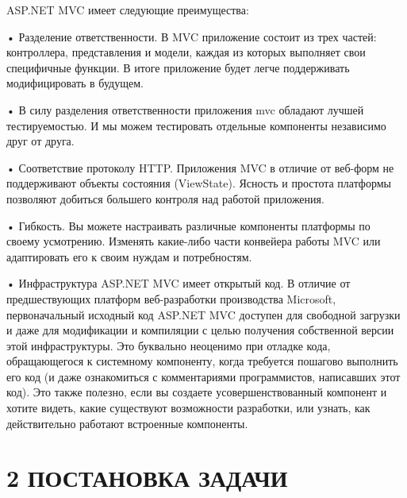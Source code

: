 \documentclass[14pt,a4paper]{extreport}
\begin{document}
	\parindent=1cm ASP.NET MVC имеет следующие преимущества:\par
	• Разделение ответственности. В MVC приложение состоит из трех частей: контроллера, представления и модели, каждая из которых выполняет свои специфичные функции. В итоге приложение будет легче поддерживать модифицировать в будущем.\par
	• В силу разделения ответственности приложения mvc обладают лучшей тестируемостью. И мы можем тестировать отдельные компоненты независимо друг от друга.\par
	• Соответствие протоколу HTTP. Приложения MVC в отличие от веб-форм не поддерживают объекты состояния (ViewState). Ясность и простота платформы позволяют добиться большего контроля над работой приложения.\par
	• Гибкость. Вы можете настраивать различные компоненты платформы по своему усмотрению. Изменять какие-либо части конвейера работы MVC или адаптировать его к своим нуждам и потребностям.\par
	• Инфраструктура ASP.NET MVC имеет открытый код. В отличие от предшествующих платформ веб-разработки производства Microsoft, первоначальный исходный код ASP.NET MVC доступен для свободной загрузки и даже для модификации и компиляции с целью получения собственной версии этой инфраструктуры. Это буквально неоценимо при отладке кода, обращающегося к системному компоненту, когда требуется пошагово выполнить его код (и даже ознакомиться с комментариями программистов, написавших этот код). Это также полезно, если вы создаете усовершенствованный компонент и хотите видеть, какие существуют возможности разработки, или узнать, как действительно работают встроенные компоненты.\par

	
	\newpage
	\section*{\normalsize\hspace{4ex}2 ПОСТАНОВКА ЗАДАЧИ}
\end{document}
